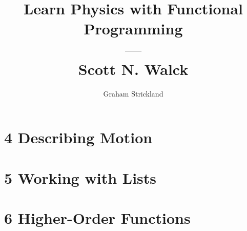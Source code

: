 \documentclass{article}
\title{Learn Physics with Functional Programming\\---\\Scott N. Walck}
\author{Graham Strickland}
\begin{document}
\maketitle  

\section*{4 Describing Motion}


\section*{5 Working with Lists}


\section*{6 Higher-Order Functions}

\end{document}
